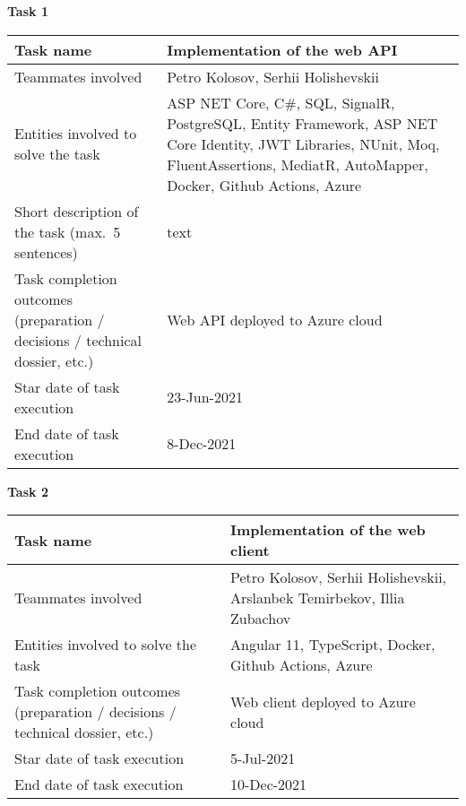 \textbf{Task 1}\\[2mm]
\begin{tabular}{|p{}|p{}|}
    \hline
    Task name                                                                    & Implementation of the web API      \\
    \hline
    Teammates involved                                                           & Petro Kolosov, Serhii Holishevskii \\
    \hline
    Entities involved to solve the task & ASP NET Core, C\#, SQL, SignalR, PostgreSQL,
    Entity Framework, ASP NET Core Identity,
    JWT Libraries, NUnit, Moq, FluentAssertions, MediatR, AutoMapper, Docker, Github Actions, Azure \\
    \hline
    Short description of the task (max.\ 5 sentences)                            & text                               \\
    \hline
    Task completion outcomes (preparation / decisions / technical dossier, etc.) & Web API deployed to Azure cloud    \\
    \hline
    Star date of task execution                                                  & 23-Jun-2021                        \\
    \hline
    End date of task execution                                                   & 8-Dec-2021                         \\
    \hline
\end{tabular}
\vskip 5mm
\hspace*{-6mm}\textbf{Task 2}\\[2mm]
\begin{tabular}{|p{}|p{}|}
    \hline
    Task name                                                                    & Implementation of the web client                                         \\
    \hline
    Teammates involved                                                           & Petro Kolosov, Serhii Holishevskii, Arslanbek Temirbekov, Illia Zubachov \\
    \hline
    Entities involved to solve the task                                          & Angular 11, TypeScript, Docker, Github Actions, Azure                    \\
    \hline
    Task completion outcomes (preparation / decisions / technical dossier, etc.) & Web client deployed to Azure cloud                                       \\
    \hline
    Star date of task execution                                                  & 5-Jul-2021                                                               \\
    \hline
    End date of task execution                                                   & 10-Dec-2021                                                              \\
    \hline
\end{tabular}
